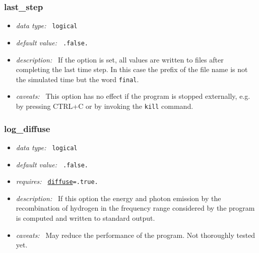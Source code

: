 \documentclass[a4paper,10pt]{article}
\begin{document}
\subsubsection{last\_step}
\label{opt:laststep}
\begin{itemize}
 \item \textit{data type:~} \texttt{logical}
 \item \textit{default value:~} \texttt{.false.}
 \item \textit{description:~} If the option is set, all values are written to 
  files after completing the last time step. In this case the prefix of the 
  file name is not the simulated time but the word \texttt{final}.
 \item \textit{caveats:~} This option has no effect if the program is 
  stopped externally, e.g. by pressing CTRL+C or by  invoking the  
  \texttt{kill} command. 
\end{itemize}



\subsubsection{log\_diffuse}
\label{opt:logdiffuse}
\begin{itemize}
 \item \textit{data type:~} \texttt{logical}
 \item \textit{default value:~} \texttt{.false.}
 \item \textit{requires:~} \texttt{\hyperref[opt:diffuse]{diffuse}=.true.}
 \item \textit{description:~} If this option the energy and photon emission
  by the recombination of hydrogen in the frequency range considered by the  
  program is computed and written to standard output.
 \item \textit{caveats:~} May reduce the performance of the program. 
  Not thoroughly tested yet.
\end{itemize}
\end{document}
